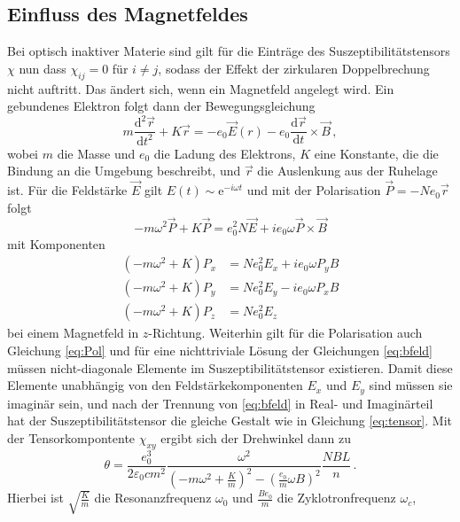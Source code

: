 \subsection{Einfluss des Magnetfeldes}
Bei optisch inaktiver Materie sind gilt für die Einträge des Suszeptibilitätstensors $\chi$ nun dass $\chi_{ij} = 0$ für $i \neq j$, 
sodass der Effekt der zirkularen Doppelbrechung nicht auftritt. Das ändert sich, wenn ein Magnetfeld angelegt wird. 
Ein gebundenes Elektron folgt dann der Bewegungsgleichung
\begin{equation*}
    m \frac{\text{d}^2 \vec{r}}{\text{d} t^2} + K \vec{r} = - e_0 \vec{E}(r) - e_0 \frac{\text{d} \vec{r}}{\text{d} t} \times \vec{B} \, ,
\end{equation*} 
wobei $m$ die Masse und $e_0$ die Ladung des Elektrons, $K$ eine Konstante, die die Bindung an die Umgebung beschreibt, und
$\vec{r}$ die Auslenkung aus der Ruhelage ist. Für die Feldstärke $\vec{E}$ gilt $E(t) \sim \text{e}^{- i \omega t}$ und
mit der Polarisation $\vec{P} = - N e_0 \vec{r}$ folgt
\begin{equation*}
    -m \omega^2 \vec{P} + K \vec{P} = e_0^2 N \vec{E} + i e_0 \omega \vec{P} \times \vec{B}
\end{equation*}
mit Komponenten
\begin{align}
    \label{eq:bfeld}
    \left(- m \omega ^2 + K\right) P_x &= N e_0^2 E_x + i e_0 \omega P_y B \\
    \left(- m \omega ^2 + K\right) P_y &= N e_0^2 E_y - i e_0 \omega P_x B \\
    \left(- m \omega ^2 + K\right) P_z &= N e_0^2 E_z  
\end{align}
bei einem Magnetfeld in $z$-Richtung. Weiterhin gilt für die Polarisation auch Gleichung \eqref{eq:Pol} und für eine nichttriviale 
Lösung der Gleichungen \eqref{eq:bfeld} müssen nicht-diagonale Elemente im Suszeptibilitätstensor existieren. Damit diese
Elemente unabhängig von den Feldstärkekomponenten $E_x$ und $E_y$ sind müssen sie imaginär sein, und nach der Trennung von
\eqref{eq:bfeld} in Real- und Imaginärteil hat der Suszeptibilitätstensor die gleiche Gestalt wie in Gleichung \eqref{eq:tensor}.
Mit der Tensorkompontente $\chi_{xy}$ ergibt sich der Drehwinkel dann zu
\begin{equation*}
    \theta = \frac{e_0^3}{2 \varepsilon_0 c m^2} \frac{\omega^2}{\left(- m \omega^2 + \frac{K}{m}\right)^2 - \left(\frac{e_0}{m} \omega B\right)^2} \frac{N B L}{n} \, . 
\end{equation*}
Hierbei ist $\sqrt{\frac{K}{m}}$ die Resonanzfrequenz $\omega_0$ und $\frac{B e_0}{m}$ die Zyklotronfrequenz $\omega_c$, 
